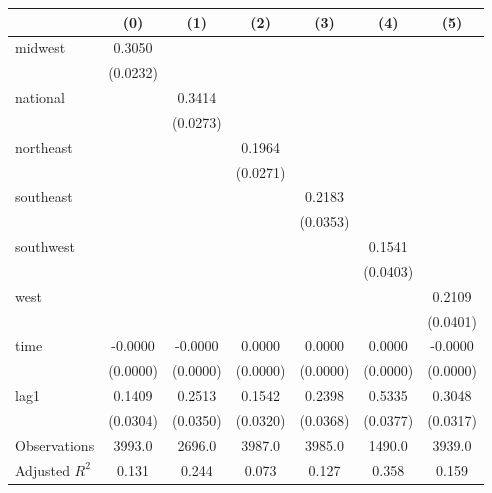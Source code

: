 \begin{tabular}{lcccccc}
\toprule
 & (0) & (1) & (2) & (3) & (4) & (5) \\
\midrule
midwest & 0.3050 &  &  &  &  &  \\
\vspace{0.2cm}
 & (0.0232) &  &  &  &  &  \\
national &  & 0.3414 &  &  &  &  \\
\vspace{0.2cm}
 &  & (0.0273) &  &  &  &  \\
northeast &  &  & 0.1964 &  &  &  \\
\vspace{0.2cm}
 &  &  & (0.0271) &  &  &  \\
southeast &  &  &  & 0.2183 &  &  \\
\vspace{0.2cm}
 &  &  &  & (0.0353) &  &  \\
southwest &  &  &  &  & 0.1541 &  \\
\vspace{0.2cm}
 &  &  &  &  & (0.0403) &  \\
west &  &  &  &  &  & 0.2109 \\
\vspace{0.2cm}
 &  &  &  &  &  & (0.0401) \\
time & -0.0000 & -0.0000 & 0.0000 & 0.0000 & 0.0000 & -0.0000 \\
\vspace{0.2cm}
 & (0.0000) & (0.0000) & (0.0000) & (0.0000) & (0.0000) & (0.0000) \\
lag1 & 0.1409 & 0.2513 & 0.1542 & 0.2398 & 0.5335 & 0.3048 \\
\vspace{0.2cm}
 & (0.0304) & (0.0350) & (0.0320) & (0.0368) & (0.0377) & (0.0317) \\
\midrule
Observations & 3993.0 & 2696.0 & 3987.0 & 3985.0 & 1490.0 & 3939.0 \\
Adjusted $R^2$ & 0.131 & 0.244 & 0.073 & 0.127 & 0.358 & 0.159 \\
\bottomrule
\end{tabular}